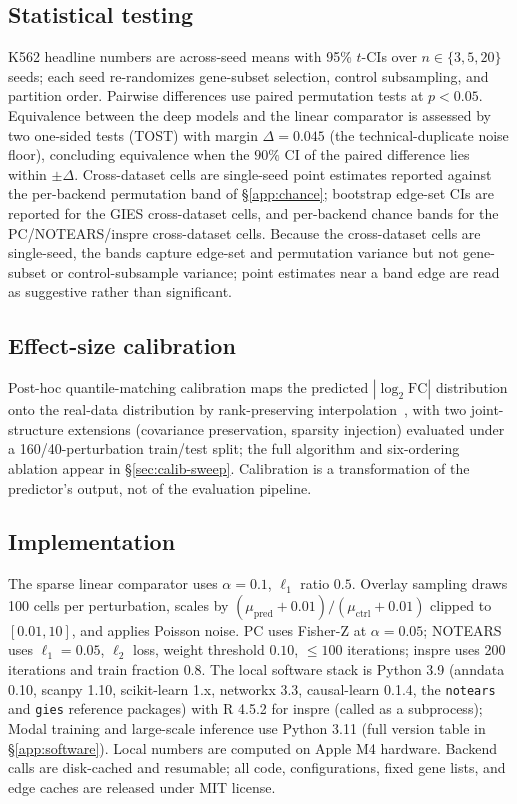 \documentclass{article}
\theoremstyle{plain}
\theoremstyle{definition}
\theoremstyle{remark}
\begin{document}
\subsection{Statistical testing}
\label{app:stats}
K562 headline numbers are across-seed means with 95\% $t$-CIs over $n\in\{3,5,20\}$ seeds; each seed re-randomizes gene-subset selection, control subsampling, and partition order. Pairwise differences use paired permutation tests at $p<0.05$. Equivalence between the deep models and the linear comparator is assessed by two one-sided tests (TOST) with margin $\Delta = 0.045$ (the technical-duplicate noise floor), concluding equivalence when the $90\%$ CI of the paired difference lies within $\pm\Delta$. Cross-dataset cells are single-seed point estimates reported against the per-backend permutation band of \S\ref{app:chance}; bootstrap edge-set CIs are reported for the GIES cross-dataset cells, and per-backend chance bands for the PC/NOTEARS/inspre cross-dataset cells. Because the cross-dataset cells are single-seed, the bands capture edge-set and permutation variance but not gene-subset or control-subsample variance; point estimates near a band edge are read as suggestive rather than significant.

\subsection{Effect-size calibration}
Post-hoc quantile-matching calibration maps the predicted $|\log_2\mathrm{FC}|$ distribution onto the real-data distribution by rank-preserving interpolation~\citep{bolstad2003,reinhard2001}, with two joint-structure extensions (covariance preservation, sparsity injection) evaluated under a 160/40-perturbation train/test split; the full algorithm and six-ordering ablation appear in \S\ref{sec:calib-sweep}. Calibration is a transformation of the predictor's output, not of the evaluation pipeline.

\subsection{Implementation}
\label{sec:impl}
The sparse linear comparator uses $\alpha=0.1$, $\ell_1$ ratio $0.5$. Overlay sampling draws 100 cells per perturbation, scales by $(\mu_{\text{pred}}+0.01)/(\mu_{\text{ctrl}}+0.01)$ clipped to $[0.01,10]$, and applies Poisson noise. PC uses Fisher-Z at $\alpha=0.05$; NOTEARS uses $\ell_1=0.05$, $\ell_2$ loss, weight threshold $0.10$, $\leq 100$ iterations; inspre uses 200 iterations and train fraction $0.8$. The local software stack is Python 3.9 (anndata 0.10, scanpy 1.10, scikit-learn 1.x, networkx 3.3, causal-learn 0.1.4, the \texttt{notears} and \texttt{gies} reference packages) with R 4.5.2 for inspre (called as a subprocess); Modal training and large-scale inference use Python 3.11 (full version table in \S\ref{app:software}). Local numbers are computed on Apple M4 hardware. Backend calls are disk-cached and resumable; all code, configurations, fixed gene lists, and edge caches are released under MIT license.
\end{document}
